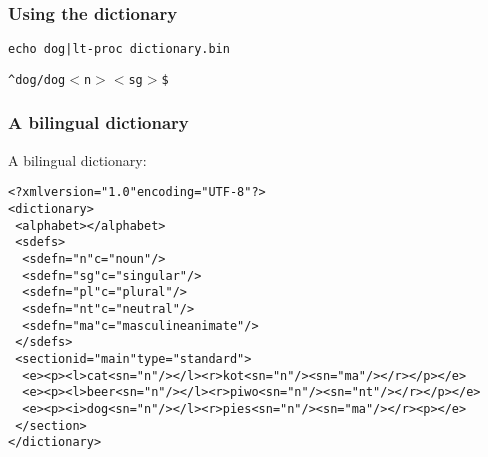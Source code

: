 \documentclass{beamer} %
\begin{document}
\begin{frame}
\frametitle{Using the dictionary}

{\tt echo dog|lt-proc dictionary.bin}

{\tt \^{}dog/dog$<$n$><$sg$>$\$}
\end{frame}

\begin{frame}
  \frametitle{A bilingual dictionary}

  \begin{exampleblock}{A bilingual dictionary:}
    \begin{footnotesize}
    \begin{alltt}
      <?xml version="1.0" encoding="UTF-8"?>\\
      <dictionary>\\
      ~<alphabet></alphabet>\\
      ~<sdefs>\\
      ~~<sdef n="n" c="noun"/>\\
      ~~<sdef n="sg" c="singular"/>\\
      ~~<sdef n="pl" c="plural"/>\\
      ~~<sdef n="nt" c="neutral"/>\\
      ~~<sdef n="ma" c="masculine animate"/>\\
      ~</sdefs>\\
      ~<section id="main" type="standard">\\
      ~~<e><p><l>cat<s n="n"/></l><r>kot<s n="n"/><s n="ma"/></r></p></e> \\
      ~~<e><p><l>beer<s n="n"/></l><r>piwo<s n="n"/><s n="nt"/></r></p></e> \\
      ~~<e><p><i>dog<s n="n"/></l><r>pies<s n="n"/><s n="ma"/></r><p></e> \\
      ~</section>\\
      </dictionary>\\
    \end{alltt}
    \end{footnotesize}
\end{exampleblock}
\end{frame}
\end{document}
